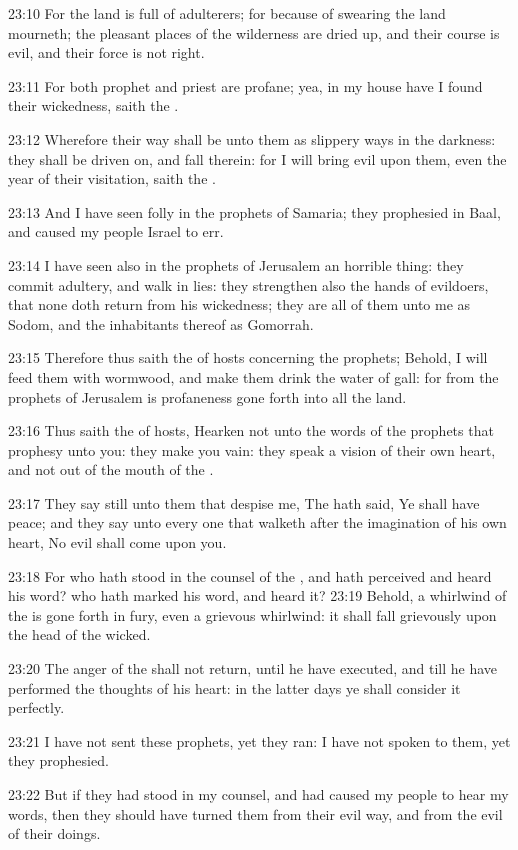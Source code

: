 23:10 For the land is full of adulterers; for because of swearing the
land mourneth; the pleasant places of the wilderness are dried up, and
their course is evil, and their force is not right.

23:11 For both prophet and priest are profane; yea, in my house have I
found their wickedness, saith the \LORD.

23:12 Wherefore their way shall be unto them as slippery ways in the
darkness: they shall be driven on, and fall therein: for I will bring
evil upon them, even the year of their visitation, saith the \LORD.

23:13 And I have seen folly in the prophets of Samaria; they
prophesied in Baal, and caused my people Israel to err.

23:14 I have seen also in the prophets of Jerusalem an horrible thing:
they commit adultery, and walk in lies: they strengthen also the hands
of evildoers, that none doth return from his wickedness; they are all
of them unto me as Sodom, and the inhabitants thereof as Gomorrah.

23:15 Therefore thus saith the \LORD of hosts concerning the prophets;
Behold, I will feed them with wormwood, and make them drink the water
of gall: for from the prophets of Jerusalem is profaneness gone forth
into all the land.

23:16 Thus saith the \LORD of hosts, Hearken not unto the words of the
prophets that prophesy unto you: they make you vain: they speak a
vision of their own heart, and not out of the mouth of the \LORD.

23:17 They say still unto them that despise me, The \LORD hath said, Ye
shall have peace; and they say unto every one that walketh after the
imagination of his own heart, No evil shall come upon you.

23:18 For who hath stood in the counsel of the \LORD, and hath
perceived and heard his word? who hath marked his word, and heard it?
23:19 Behold, a whirlwind of the \LORD is gone forth in fury, even a
grievous whirlwind: it shall fall grievously upon the head of the
wicked.

23:20 The anger of the \LORD shall not return, until he have executed,
and till he have performed the thoughts of his heart: in the latter
days ye shall consider it perfectly.

23:21 I have not sent these prophets, yet they ran: I have not spoken
to them, yet they prophesied.

23:22 But if they had stood in my counsel, and had caused my people to
hear my words, then they should have turned them from their evil way,
and from the evil of their doings.

